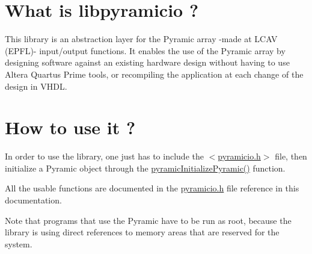 \hypertarget{index_Wh}{}\section{What is libpyramicio ?}\label{index_Wh}
This library is an abstraction layer for the Pyramic array -\/made at L\+C\+AV (E\+P\+FL)-\/ input/output functions. It enables the use of the Pyramic array by designing software against an existing hardware design without having to use Altera Quartus Prime tools, or recompiling the application at each change of the design in V\+H\+DL.\hypertarget{index_Hw}{}\section{How to use it ?}\label{index_Hw}
In order to use the library, one just has to include the $<$\hyperlink{pyramicio_8h}{pyramicio.\+h}$>$ file, then initialize a Pyramic object through the \hyperlink{pyramicio_8h_ac3c433fb9ac54d8e5e93a2423ed79e5e}{pyramic\+Initialize\+Pyramic()} function.

All the usable functions are documented in the \hyperlink{pyramicio_8h}{pyramicio.\+h} file reference in this documentation.

Note that programs that use the Pyramic have to be run as root, because the library is using direct references to memory areas that are reserved for the system. 